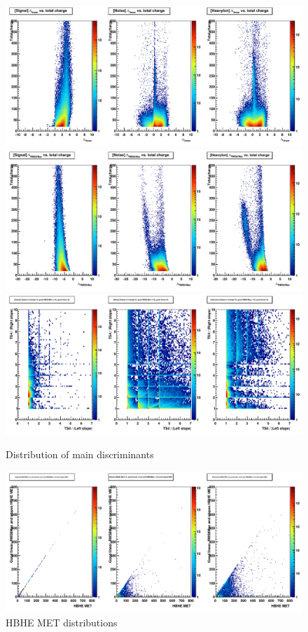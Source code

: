\begin{figure}
\includegraphics[width=120mm]{DailyLog/6352/6352_Comparison20_Comparison_HLambdaLinearVsTotalCharge}
\includegraphics[width=120mm]{DailyLog/6352/6352_Comparison20_Comparison_HLambdaRMS8MaxVsTotalCharge}
\includegraphics[width=120mm]{DailyLog/6352/6352_Comparison20_Comparison_HTriangleFitTS4OverSlopesGoodLinearGoodRMS8Max}
\caption{Distribution of main discriminants}
\label{Figure_6352_Discriminants}
\end{figure}

\begin{figure}
\includegraphics[width=120mm]{DailyLog/6352/6352_Comparison20_Comparison_HHBHEMETVsGoodLinearRMS8MaxSlopesHBHEMET}
\caption{HBHE MET distributions}
\label{Figure_6352_HBHEMET}
\end{figure}

